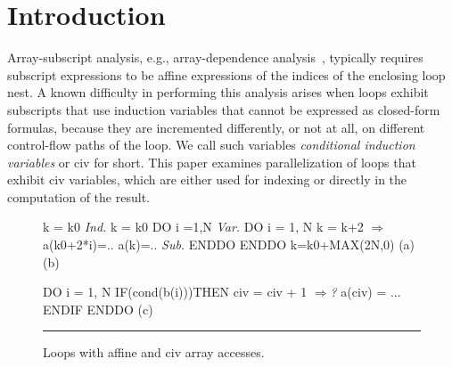 \documentclass{sig-alternate}
\newcommand{\emp}[1]{\textcolor{DikuRed}{ #1}}
\newcommand{\emphh}[1]{\textcolor{CosGreen}{ #1}}
\newcommand{\mymath}[1]{$ #1 $}
\begin{document}





\section{Introduction}


\enlargethispage{\baselineskip}

Array-subscript analysis, e.g., array-dependence analysis~\cite{BanerjeeIneqTest,FeautrierDataflow,Pugh92theomega},
typically requires subscript expressions to be affine expressions
of the indices of the enclosing loop nest.   A known difficulty in 
performing this analysis arises when loops exhibit subscripts that
use induction variables that cannot be expressed as closed-form
formulas, because they are incremented differently, or not at all, on 
different control-flow paths of the loop.   We call such variables
{\em conditional induction variables} or {\sc civ} for short.
This paper examines parallelization of loops that exhibit 
{\sc civ} variables, which are either used for indexing or 
directly in the computation of the result.

\begin{figure}
\begin{minipage}{0.58\columnwidth}
\begin{colorcode}
k = k0     \emphh{\em Ind.}  k = k0        
DO i =1,N  \emphh{\em Var.}  DO i = 1, N      
  k = k+2    \emphh{\mymath{\Rightarrow}}    a(k0+2*i)=.. 
  a(k)=..  \emphh{\em Sub.}  ENDDO         
ENDDO            k=k0+MAX(2N,0)
   (a)               (b) 
\end{colorcode}
\end{minipage}
\begin{minipage}{0.35\columnwidth}
\begin{colorcode}
DO i = 1, N
 IF(cond(b(i)))THEN 
    civ = civ + 1 \emp{\mymath{\Rightarrow}{\em ?}} 
    a(civ) = ...
ENDIF ENDDO
      (c)
\end{colorcode}
\end{minipage}
\hrule
\caption{Loops with affine and {\sc civ} array accesses.}
\label{fig:introEg}
\vspace{-2ex}
\end{figure}
\end{document}
